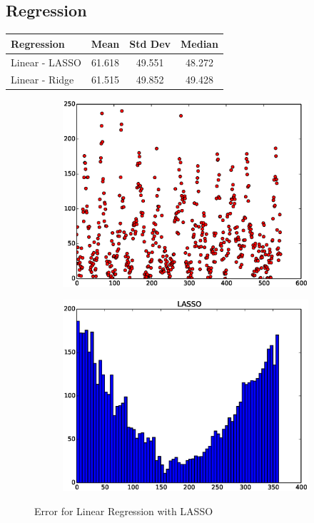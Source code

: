 \documentclass{article}
\begin{document}
\subsection{Regression}

\begin{center}
\begin{tabular}{l|c|c|c}
Regression & Mean & Std Dev & Median\\
\hline
Linear - LASSO & 61.618 & 49.551 & 48.272 \\
Linear - Ridge & 61.515 & 49.852 & 49.428
\end{tabular}
\end{center}

\begin{figure}[H]
  \begin{subfigure}[!h]{0.5\textwidth}
    \centering
    \includegraphics[width=\textwidth]{./woodley/LASSO_heading_plot.eps}
  \end{subfigure}
  \begin{subfigure}[!h]{0.5\textwidth}
    \centering
    \includegraphics[width=\textwidth]{./woodley/LASSO_heading_bar.eps}
  \end{subfigure}
  \caption{Error for Linear Regression with LASSO}
\end{figure}
\end{document}
